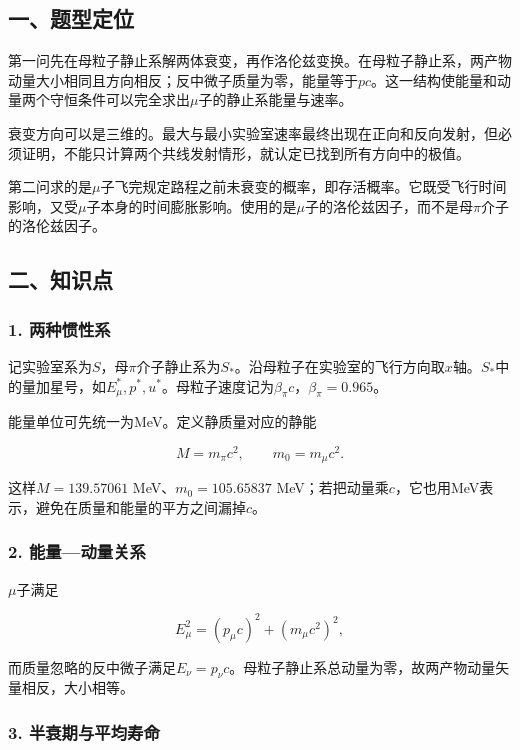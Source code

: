 \documentclass[12pt,a4paper,fontset=fandol]{ctexart}
\begin{document}
\subsection{一、题型定位}\label{ux4e00ux9898ux578bux5b9aux4f4d-5}

第一问先在母粒子静止系解两体衰变，再作洛伦兹变换。在母粒子静止系，两产物动量大小相同且方向相反；反中微子质量为零，能量等于\(pc\)。这一结构使能量和动量两个守恒条件可以完全求出\(\mu\)子的静止系能量与速率。

衰变方向可以是三维的。最大与最小实验室速率最终出现在正向和反向发射，但必须证明，不能只计算两个共线发射情形，就认定已找到所有方向中的极值。

第二问求的是\(\mu\)子飞完规定路程之前未衰变的概率，即存活概率。它既受飞行时间影响，又受\(\mu\)子本身的时间膨胀影响。使用的是\(\mu\)子的洛伦兹因子，而不是母\(\pi\)介子的洛伦兹因子。

\subsection{二、知识点}\label{ux4e8cux77e5ux8bc6ux70b9-5}

\subsubsection{1. 两种惯性系}\label{ux4e24ux79cdux60efux6027ux7cfb}

记实验室系为\(S\)，母\(\pi\)介子静止系为\(S_*\)。沿母粒子在实验室的飞行方向取\(x\)轴。\(S_*\)中的量加星号，如\(E_\mu^*,p^*,u^*\)。母粒子速度记为\(\beta_\pi c\)，\(\beta_\pi=0.965\)。

能量单位可先统一为MeV。定义静质量对应的静能

\[
M=m_\pi c^2,\qquad m_0=m_\mu c^2.
\]

这样\(M=139.57061\) MeV、\(m_0=105.65837\)
MeV；若把动量乘\(c\)，它也用MeV表示，避免在质量和能量的平方之间漏掉\(c\)。

\subsubsection{2.
能量---动量关系}\label{ux80fdux91cfux52a8ux91cfux5173ux7cfb}

\(\mu\)子满足

\[
E_\mu^2=(p_\mu c)^2+(m_\mu c^2)^2,
\]

而质量忽略的反中微子满足\(E_\nu=p_\nu c\)。母粒子静止系总动量为零，故两产物动量矢量相反，大小相等。

\subsubsection{3.
半衰期与平均寿命}\label{ux534aux8870ux671fux4e0eux5e73ux5747ux5bffux547d}
\end{document}
